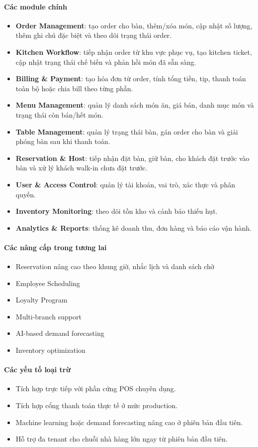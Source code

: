 \documentclass[12pt,a4paper]{article}
\begin{document}
\paragraph{Các module chính}
\begin{itemize}
    \item \textbf{Order Management}: tạo order cho bàn, thêm/xóa món, cập nhật số lượng, thêm ghi chú đặc biệt và theo dõi trạng thái order.
    \item \textbf{Kitchen Workflow}: tiếp nhận order từ khu vực phục vụ, tạo kitchen ticket, cập nhật trạng thái chế biến và phản hồi món đã sẵn sàng.
    \item \textbf{Billing \& Payment}: tạo hóa đơn từ order, tính tổng tiền, tip, thanh toán toàn bộ hoặc chia bill theo từng phần.
    \item \textbf{Menu Management}: quản lý danh sách món ăn, giá bán, danh mục món và trạng thái còn bán/hết món.
    \item \textbf{Table Management}: quản lý trạng thái bàn, gán order cho bàn và giải phóng bàn sau khi thanh toán.
    \item \textbf{Reservation \& Host}: tiếp nhận đặt bàn, giữ bàn, cho khách đặt trước vào bàn và xử lý khách walk-in chưa đặt trước.
    \item \textbf{User \& Access Control}: quản lý tài khoản, vai trò, xác thực và phân quyền.
    \item \textbf{Inventory Monitoring}: theo dõi tồn kho và cảnh báo thiếu hụt.
    \item \textbf{Analytics \& Reports}: thống kê doanh thu, đơn hàng và báo cáo vận hành.
\end{itemize}

\paragraph{Các nâng cấp trong tương lai}
\begin{itemize}
    \item Reservation nâng cao theo khung giờ, nhắc lịch và danh sách chờ
    \item Employee Scheduling
    \item Loyalty Program
    \item Multi-branch support
    \item AI-based demand forecasting
    \item Inventory optimization
\end{itemize}

\paragraph{Các yếu tố loại trừ}
\begin{itemize}
    \item Tích hợp trực tiếp với phần cứng POS chuyên dụng.
    \item Tích hợp cổng thanh toán thực tế ở mức production.
    \item Machine learning hoặc demand forecasting nâng cao ở phiên bản đầu tiên.
    \item Hỗ trợ đa tenant cho chuỗi nhà hàng lớn ngay từ phiên bản đầu tiên.
\end{itemize}
\end{document}
